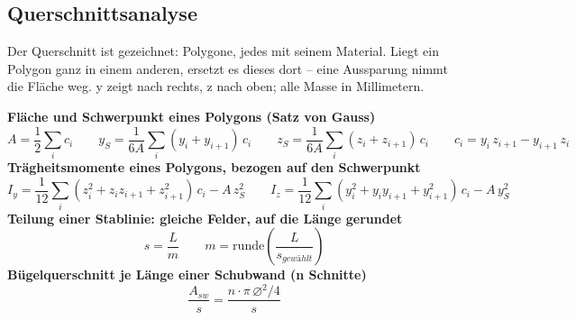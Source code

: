\documentclass[11pt,a4paper]{article}
\begin{document}
\subsection{Querschnittsanalyse}
Der Querschnitt ist gezeichnet: Polygone, jedes mit seinem Material. Liegt ein Polygon ganz in einem anderen, ersetzt es dieses dort -- eine Aussparung nimmt die Fläche weg. y zeigt nach rechts, z nach oben; alle Masse in Millimetern.

\noindent\textbf{Fläche und Schwerpunkt eines Polygons (Satz von Gauss)}
\begin{equation*}
A = \frac{1}{2} \sum_i c_i \qquad y_S = \frac{1}{6A} \sum_i (y_i + y_{i+1})\, c_i \qquad z_S = \frac{1}{6A} \sum_i (z_i + z_{i+1})\, c_i \qquad c_i = y_i\, z_{i+1} - y_{i+1}\, z_i
\end{equation*}
\noindent\textbf{Trägheitsmomente eines Polygons, bezogen auf den Schwerpunkt}
\begin{equation*}
I_y = \frac{1}{12} \sum_i (z_i^2 + z_i z_{i+1} + z_{i+1}^2)\, c_i - A\, z_S^2\qquad I_z = \frac{1}{12} \sum_i (y_i^2 + y_i y_{i+1} + y_{i+1}^2)\, c_i - A\, y_S^2
\end{equation*}
\noindent\textbf{Teilung einer Stablinie: gleiche Felder, auf die Länge gerundet}
\begin{equation*}
s = \frac{L}{m} \qquad m = \mathrm{runde}\left(\frac{L}{s_{gewählt}}\right)
\end{equation*}
\noindent\textbf{Bügelquerschnitt je Länge einer Schubwand (n Schnitte)}
\begin{equation*}
\frac{A_{sw}}{s} = \frac{n \cdot \pi\, \varnothing^2 / 4}{s}
\end{equation*}
\end{document}
